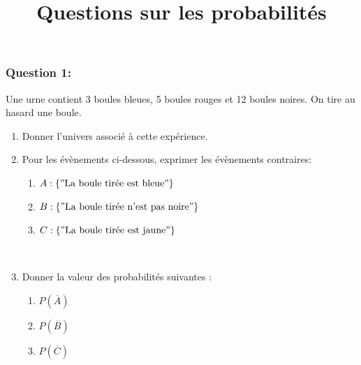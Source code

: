\documentclass[t,12pt]{beamer}
\title{Questions sur les probabilités }
\author{}
\date{}
\begin{document}
\maketitle	

\begin{frame}
	\frametitle{Question 1: }
	Une urne contient 3 boules bleues, 5 boules rouges et 12 boules noires. On tire au hasard une boule. 
	
	\begin{enumerate}
		\item Donner l'univers associé à cette expérience.  
		\item Pour les évènements ci-dessous, exprimer les évènements contraires:
		\begin{enumerate}[$\square$]
			\item $A : \{"\text{La boule tirée est bleue}"\}$
			\item $B : \{"\text{La boule tirée n'est pas noire}"\}$
			\item $C : \{"\text{La boule tirée est jaune}"\}$
		\end{enumerate}
	\hfill\\
		\item Donner la valeur des probabilités suivantes :\\ 
		\begin{multicols}{3}
			\begin{enumerate}[$\square$]
				\item $P(\overline{A})$
				\item $P(\overline{B})$
				\item $P(\overline{C})$
			\end{enumerate}
		\end{multicols}
	
	\end{enumerate}
	

\end{frame}
\end{document}
